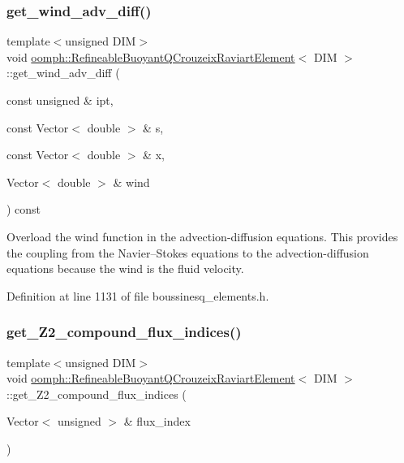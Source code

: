 \subsubsection{\texorpdfstring{get\+\_\+wind\+\_\+adv\+\_\+diff()}{get\_wind\_adv\_diff()}}
{\footnotesize\ttfamily template$<$unsigned D\+IM$>$ \\
void \hyperlink{classoomph_1_1RefineableBuoyantQCrouzeixRaviartElement}{oomph\+::\+Refineable\+Buoyant\+Q\+Crouzeix\+Raviart\+Element}$<$ D\+IM $>$\+::get\+\_\+wind\+\_\+adv\+\_\+diff (\begin{DoxyParamCaption}\item[{const unsigned \&}]{ipt,  }\item[{const Vector$<$ double $>$ \&}]{s,  }\item[{const Vector$<$ double $>$ \&}]{x,  }\item[{Vector$<$ double $>$ \&}]{wind }\end{DoxyParamCaption}) const\hspace{0.3cm}{\ttfamily [inline]}}



Overload the wind function in the advection-\/diffusion equations. This provides the coupling from the Navier--Stokes equations to the advection-\/diffusion equations because the wind is the fluid velocity. 



Definition at line 1131 of file boussinesq\+\_\+elements.\+h.

\mbox{\label{classoomph_1_1RefineableBuoyantQCrouzeixRaviartElement_ac8b5c8d8df0dc6d7af67570c609f591b}} 
\subsubsection{\texorpdfstring{get\+\_\+\+Z2\+\_\+compound\+\_\+flux\+\_\+indices()}{get\_Z2\_compound\_flux\_indices()}}
{\footnotesize\ttfamily template$<$unsigned D\+IM$>$ \\
void \hyperlink{classoomph_1_1RefineableBuoyantQCrouzeixRaviartElement}{oomph\+::\+Refineable\+Buoyant\+Q\+Crouzeix\+Raviart\+Element}$<$ D\+IM $>$\+::get\+\_\+\+Z2\+\_\+compound\+\_\+flux\+\_\+indices (\begin{DoxyParamCaption}\item[{Vector$<$ unsigned $>$ \&}]{flux\+\_\+index }\end{DoxyParamCaption})\hspace{0.3cm}{\ttfamily [inline]}}



